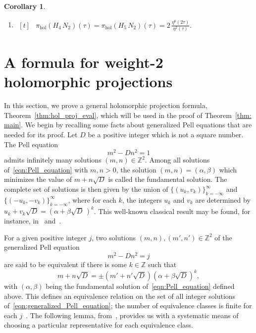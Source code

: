 \documentclass[11pt,reqno]{amsart}
\newtheorem{corollary}[theorem]{Corollary}
\renewcommand{\=}{\;=\;}
\theoremstyle{myremark}
\begin{document}
\begin{corollary}
\begin{enumerate}[label=\arabic*., itemsep=1em]
\item $\displaystyle
\begin{aligned}[t]
&
\pi_{\mathrm{hol}}\left(H_{4}\,N_2\right)(\tau)
=
\pi_{\mathrm{hol}}\left(H_{5}\,N_2\right)(\tau)
=
2\,
\frac{\eta^6(2\tau)}
{\eta^2(\tau)}.
\end{aligned}
$

\end{enumerate}
\end{corollary}


\section{A formula for weight-2 holomorphic projections}
\label{sec:formulaholoproj}

In this section, we prove a general holomorphic projection formula, Theorem~\ref{thm:hol_proj_eval}, which will be used in the proof of Theorem~\ref{thm: main}. 
We begin by recalling some facts about generalized Pell equations that are needed for its proof.
Let $D$ be a positive integer which is not a square number. The Pell equation
\begin{equation} \label{eqn:Pell_equation}
m^2 - D n^2 = 1
\end{equation}
admits infinitely many solutions $(m,n) \in \mathbb{Z}^2$. 
Among all solutions of~\eqref{eqn:Pell_equation} with $m,n>0$, the solution $(m,n) = (\alpha,\beta)$ which minimizes the value of $m+n\sqrt{D}$ is called the fundamental solution. 
The complete set of solutions is then given by the union of $\{(u_k,v_k)\}_{k=-\infty}^\infty$ and $\{(-u_k,-v_k)\}_{k=-\infty}^\infty$, where for each $k$, the integers $u_k$ and $v_k$ are determined by $u_k+v_k\sqrt{D} = (\alpha+\beta\sqrt{D}\,)^k$. 
This well-known classical result may be found, for instance, in~\cite[pp.~493--494]{Dirichlet1855} and~\cite[pp.~209--210]{Hermite1851}.

For a given positive integer $j$, two solutions $(m,n), (m',n') \in \mathbb{Z}^2$ of the generalized Pell equation
\begin{equation} \label{eqn:generalized_Pell_equation}
m^2 - Dn^2 = j
\end{equation}
are said to be equivalent if there is some $k \in \mathbb{Z}$ such that
\[ m+n\sqrt{D} = \pm(m'+n'\sqrt{D})(\alpha+\beta\sqrt{D})^k, \]
with $(\alpha,\beta)$ being the fundamental solution of~\eqref{eqn:Pell_equation} defined above. 
This defines an equivalence relation on the set of all integer solutions of~\eqref{eqn:generalized_Pell_equation}; the number of equivalence classes is finite for each $j$~\cite[p.~9]{Frattini1904}. 
The following lemma, from~\cite[p.~396]{Andrews1988}, provides us with a systematic means of choosing a particular representative for each equivalence class.
\end{document}
